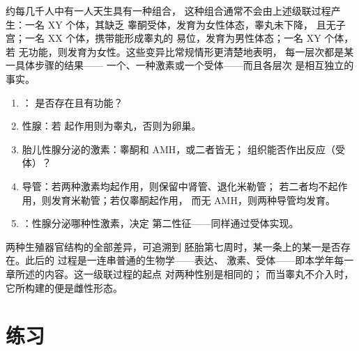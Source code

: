 \begin{example}[层次不一致的情形]\label{ex:g11:becoming-male-female:disagree}
约每几千人中有一人天生具有一种组合，
这种组合通常不会由上述级联过程产生：一名 XY 个体，其缺乏
睾酮受体，发育为女性体态，睾丸未下降，
且无子宫；一名 XX 个体，携带能形成睾丸的
 易位，发育为男性体态；一名 XY 个体，若 
无功能，则发育为女性。这些变异比常规情形更清楚地表明，
每一层次都是某一具体步骤的结果——
一个、一种激素或一个受体——而且各层次
是相互独立的事实。
\end{example}

\begin{method}[根据具体情形推理]\label{met:g11:becoming-male-female:case}
\begin{enumerate}
  \item {}： 是否存在且有功能？
  \item 性腺：若  起作用则为睾丸，否则为卵巢。
  \item 胎儿性腺分泌的激素：睾酮和 AMH，或二者皆无；
        组织能否作出反应（受体）？
  \item 导管：若两种激素均起作用，则保留中肾管、退化米勒管；
        若二者均不起作用，则发育米勒管；若仅睾酮起作用，
        而无 AMH，则两种导管均发育。
  \item {}：性腺分泌哪种性激素，决定
        第二性征——同样通过受体实现。
\end{enumerate}
\end{method}

\begin{remark}\label{rem:g11:becoming-male-female:onegene}
两种生殖器官结构的全部差异，可追溯到
胚胎第七周时，某一条上的某一是否存在。此后的
过程是一连串普通的生物学——表达、
激素、受体——即本学年每一章所述的内容。这一级联过程的起点
对两种性别是相同的；
而当睾丸不介入时，
它所构建的便是雌性形态。
\end{remark}

\section{练习}


